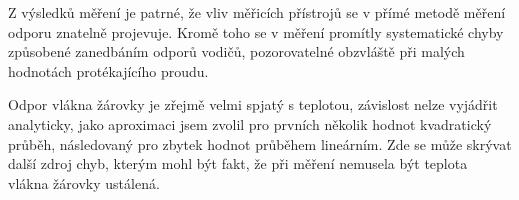 \documentclass[0-protokol.tex]{subfiles}
\begin{document}
Z výsledků měření je patrné, že vliv měřicích přístrojů se v přímé metodě měření odporu znatelně projevuje. Kromě toho se v měření promítly systematické chyby způsobené zanedbáním odporů vodičů, pozorovatelné obzvláště při malých hodnotách protékajícího proudu. 

Odpor vlákna žárovky je zřejmě velmi spjatý s teplotou, závislost nelze vyjádřit analyticky, jako aproximaci jsem zvolil pro prvních několik hodnot kvadratický průběh, následovaný pro zbytek hodnot průběhem lineárním. Zde se může skrývat další zdroj chyb, kterým mohl být fakt, že při měření nemusela být teplota vlákna žárovky ustálená.
\end{document}
